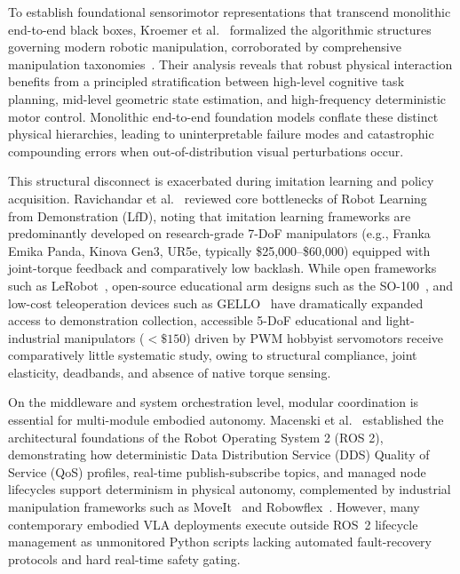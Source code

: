 \documentclass[journal]{IEEEtran}
\begin{document}
To establish foundational sensorimotor representations that transcend monolithic end-to-end black boxes, Kroemer et al.~\cite{kroemer2021review} formalized the algorithmic structures governing modern robotic manipulation, corroborated by comprehensive manipulation taxonomies~\cite{billard2019trends,aria_001_ravichandar_2020_recent}. Their analysis reveals that robust physical interaction benefits from a principled stratification between high-level cognitive task planning, mid-level geometric state estimation, and high-frequency deterministic motor control. Monolithic end-to-end foundation models conflate these distinct physical hierarchies, leading to uninterpretable failure modes and catastrophic compounding errors when out-of-distribution visual perturbations occur.

This structural disconnect is exacerbated during imitation learning and policy acquisition. Ravichandar et al.~\cite{aria_001_ravichandar_2020_recent} reviewed core bottlenecks of Robot Learning from Demonstration (LfD), noting that imitation learning frameworks are predominantly developed on research-grade 7-DoF manipulators (e.g., Franka Emika Panda, Kinova Gen3, UR5e, typically \$25{,}000--\$60{,}000) equipped with joint-torque feedback and comparatively low backlash. While open frameworks such as LeRobot~\cite{aria_084_cadene_2026_lerobot}, open-source educational arm designs such as the SO-100~\cite{lerobot_so100_2024}, and low-cost teleoperation devices such as GELLO~\cite{aria_014_wu_2024_gello} have dramatically expanded access to demonstration collection, accessible 5-DoF educational and light-industrial manipulators ($<\$150$) driven by PWM hobbyist servomotors receive comparatively little systematic study, owing to structural compliance, joint elasticity, deadbands, and absence of native torque sensing.

On the middleware and system orchestration level, modular coordination is essential for multi-module embodied autonomy. Macenski et al.~\cite{aria_022_macenski_2022_robot} established the architectural foundations of the Robot Operating System 2 (ROS 2), demonstrating how deterministic Data Distribution Service (DDS) Quality of Service (QoS) profiles, real-time publish-subscribe topics, and managed node lifecycles support determinism in physical autonomy, complemented by industrial manipulation frameworks such as MoveIt~\cite{aria_017_industrial_2022_moveit} and Robowflex~\cite{aria_114_kingston_2022_robowflex}. However, many contemporary embodied VLA deployments execute outside ROS~2 lifecycle management as unmonitored Python scripts lacking automated fault-recovery protocols and hard real-time safety gating.
\end{document}
